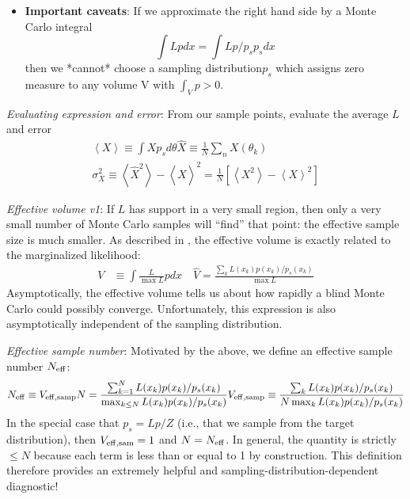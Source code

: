 \documentclass[twocolumn,prd,nofootinbib]{revtex4}
\begin{document}
\begin{widetext}
\begin{itemize}
\item \textbf{Important caveats}:
 If we approximate the right hand side by a Monte Carlo integral
\[
	\int L p dx = \int L p/p_s  p_s dx
\]
then we *cannot* choose a sampling distribution$ p_s$ which assigns zero measure to any volume V with $\int_V p >0.$
\end{itemize}

\noindent \emph{Evaluating expression and error}: From our sample points, evaluate the average $L$ and error
\begin{subequations}
\begin{eqnarray}
\label{eq:EvaluateMCIntegral}
\left< X \right> \equiv \int X p_s d\theta 
\hat{X} \equiv \frac{1}{N} \sum_n X(\theta_k)\\ 
\label{eq:ErrorEstimateMC}\sigma_X^2 \equiv \left<\hat{X}^2\right> -\left<\hat{X}\right>^2 
 = \frac{1}{N}[\left<X^2\right> - \left<X\right>^2] 
\end{eqnarray}
\end{subequations}



\noindent \emph{Effective volume v1}: If $L$ has support in a very small region, then only a very small number of
Monte Carlo samples will ``find'' that point: the effective sample size is much smaller.  As described in \cite{gwastro-mergers-HeeSuk-CompareToPE-Aligned}, the
effective volume is exactly related to the marginalized likelihood:
\begin{align}
V           &\equiv \int \frac{L}{\max L} p dx  \quad \hat{V} = \frac{\sum_k L(x_k)p(x_k)/p_s(x_k)}{\max L}
\end{align}
Asymptotically, the effective volume tells us about how rapidly a blind Monte Carlo could possibly converge. 
%
Unfortunately, this expression is also asymptotically independent  of the sampling distribution. 


\noindent\emph{Effective sample number}: Motivated by the above, we define an effective sample number $N_{\rm eff}$:
\begin{align}
N_{\rm eff} & \equiv V_{\rm eff,samp} N = \frac{\sum_{k=1}^N L(x_k) p(x_k)/p_s(x_k)}{ \max_{k\le N} L(x_k)  p(x_k)/p_s(x_k)}
V_{\rm eff,samp} \equiv \frac{\sum_k L(x_k) p(x_k)/p_s(x_k)}{N \max_k L(x_k)  p(x_k)/p_s(x_k)} \\
\end{align}
In the special case that $p_s = Lp/Z$ (i.e., that we sample from the target distribution), then $V_{\rm eff,sam} = 1$
and $N=N_{\rm eff}$.  In general, the quantity is strictly $\le N$ because each term is less than or equal to 1 by
construction.  This definition therefore provides an extremely helpful and sampling-distribution-dependent diagnostic!


\end{widetext}
\end{document}
